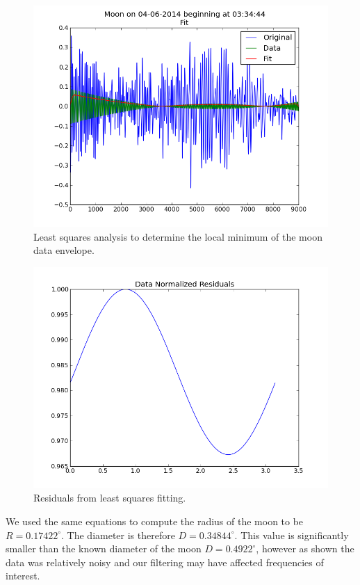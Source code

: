 \documentclass{article}
\begin{document}
    \begin{figure}[ht!]
    \centering
    \includegraphics[scale=0.5]{img/moon/data_analysis.png}
    \caption{Least squares analysis to determine the local minimum of the
    moon data envelope.}
    \label{fig:moon_analysis}
    \end{figure}

    \begin{figure}[ht!]
    \centering
    \includegraphics[scale=0.5]{img/moon/data_residual.png}
    \caption{Residuals from least squares fitting.}
    \label{fig:moon_residual}
    \end{figure}

    We used the same equations to compute the radius of the moon to be
    $R=0.17422^{\circ}$. The diameter is therefore $D = 0.34844^{\circ}$. This value is
    significantly smaller than the known diameter of the moon $D = 0.4922^{\circ}$,
    however as shown the data was relatively noisy and our filtering may have
    affected frequencies of interest.
\end{document}
